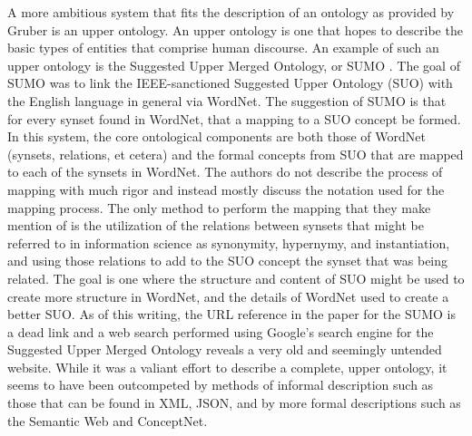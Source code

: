 \documentclass[letterpaper, 10 pt, conference]{ieeeconf}
\begin{document}
A more ambitious system that fits the description of an ontology as provided by Gruber is an upper ontology. An upper ontology is one that hopes to describe the basic types of entities that comprise human discourse. An example of such an upper ontology is the Suggested Upper Merged Ontology, or SUMO \textcolor{gray}{\cite{Niles}}. The goal of SUMO was to link the IEEE-sanctioned Suggested Upper Ontology (SUO) with the English language in general via WordNet. The suggestion of SUMO is that for every synset found in WordNet, that a mapping to a SUO concept be formed. In this system, the core ontological components are both those of WordNet (synsets, relations, et cetera) and the formal concepts from SUO that are mapped to each of the synsets in WordNet. The authors do not describe the process of mapping with much rigor and instead mostly discuss the notation used for the mapping process. The only method to perform the mapping that they make mention of is the utilization of the relations between synsets that might be referred to in information science as synonymity, hypernymy, and instantiation, and using those relations to add to the SUO concept the synset that was being related. The goal is one where the structure and content of SUO might be used to create more structure in WordNet, and the details of WordNet used to create a better SUO. As of this writing, the URL reference in the paper for the SUMO is a dead link and a web search performed using Google's search engine for the Suggested Upper Merged Ontology reveals a very old and seemingly untended website. While it was a valiant effort to describe a complete, upper ontology, it seems to have been outcompeted by methods of informal description such as those that can be found in XML, JSON, and by more formal descriptions such as the Semantic Web and ConceptNet.
\end{document}
